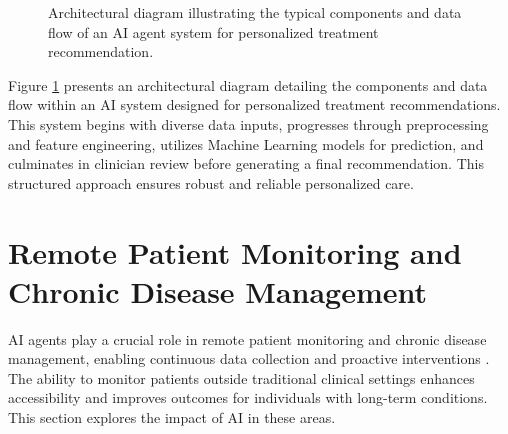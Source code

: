 \documentclass[12pt,a4paper]{article}
\begin{document}
\begin{figure}[H]
    \centering
    \caption{Architectural diagram illustrating the typical components and data flow of an AI agent system for personalized treatment recommendation.}
    \label{fig:ai_architecture}
\end{figure}
Figure \ref{fig:ai_architecture} presents an architectural diagram detailing the components and data flow within an AI system designed for personalized treatment recommendations. This system begins with diverse data inputs, progresses through preprocessing and feature engineering, utilizes Machine Learning models for prediction, and culminates in clinician review before generating a final recommendation. This structured approach ensures robust and reliable personalized care.

\section{Remote Patient Monitoring and Chronic Disease Management}
AI agents play a crucial role in remote patient monitoring and chronic disease management, enabling continuous data collection and proactive interventions \cite{televox_patient_engagement}. The ability to monitor patients outside traditional clinical settings enhances accessibility and improves outcomes for individuals with long-term conditions. This section explores the impact of AI in these areas.
\end{document}
